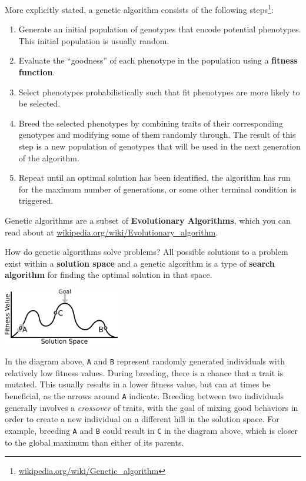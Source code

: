 \documentclass[10pt]{book}
\begin{document}
More explicitly stated, a genetic algorithm consists of the following 
steps\footnote{\url{wikipedia.org/wiki/Genetic_algorithm}}:

\begin{enumerate}
  \item Generate an initial population of genotypes that encode potential
  phenotypes. This initial population is usually random.

  \item Evaluate the ``goodness'' of each phenotype in the population using a 
  {\bf fitness function}.

  \item Select phenotypes probabilistically such that fit phenotypes 
  are more likely to be selected.

  \item Breed the selected phenotypes by combining 
  traits of their corresponding genotypes and modifying some of them randomly through. 
  The result of this step is a new population of genotypes that will be used in
  the next generation of the algorithm.

  \item Repeat until an optimal solution has been identified, the algorithm has run for the maximum 
  number of generations, or some other terminal condition is triggered.

\end{enumerate}

Genetic algorithms are a subset of {\bf Evolutionary Algorithms}, which you can
read about at \url{wikipedia.org/wiki/Evolutionary_algorithm}.

How do genetic algorithms solve problems? All possible solutions to a problem
exist within a {\bf solution space} and a genetic algorithm is a type of
{\bf search algorithm} for finding the optimal solution in that space.

\beforefig
\centerline{\includegraphics[width=2in]{./figs/GeneticAlgStateSpace.eps}}
\afterfig

In the diagram above, {\tt A} and {\tt B} represent randomly generated
individuals with relatively low fitness values. During breeding, there is a
chance that a trait is mutated. This usually results in a lower fitness value,
but can at times be beneficial, as the arrows around {\tt A}
indicate. Breeding between two individuals
generally involves a {\em crossover} of traits, 
with the goal of mixing good behaviors in order to create a new individual 
on a different hill in the solution space. For example, breeding {\tt A} 
and {\tt B} could result in {\tt C} in the diagram above, which is closer 
to the global maximum than either of its parents.
 
\end{document}
